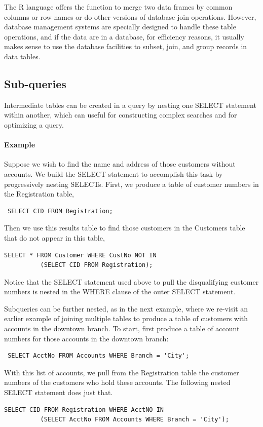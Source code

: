 The R language offers the  function to 
merge two data frames by common columns or row names or do other
versions of database join operations.
However, database management systems are specially designed to handle
these table operations, and if the data are in a database,
for efficiency reasons, it usually makes sense to use the database
facilities to subset, join, and group records in data tables.

\subsection{Sub-queries}
Intermediate tables can be created in a query by nesting 
one SELECT statement within another, 
which can useful for constructing complex searches 
and for optimizing a query.

\paragraph{Example}
Suppose we wish to find the name and address 
of those customers without accounts.
We build the SELECT statement to accomplish this task
by progressively nesting SELECTs. 
First, we produce a table of customer numbers
in the Registration table,
\begin{verbatim}
 SELECT CID FROM Registration;
\end{verbatim}
Then we use this results table to find those customers in 
the Customers table that do not appear in this table,
\begin{verbatim}
SELECT * FROM Customer WHERE CustNo NOT IN 
          (SELECT CID FROM Registration);
\end{verbatim}
Notice that the SELECT statement used above to pull the disqualifying 
customer numbers is nested in the WHERE clause of the outer SELECT statement.

Subqueries can be further nested, as in the next example, where
we re-visit an earlier example of joining multiple tables to produce a 
table of customers with accounts in the downtown branch.
To start, first produce a table of account numbers for those 
accounts in the downtown branch:
\begin{verbatim}
 SELECT AcctNo FROM Accounts WHERE Branch = 'City';
\end{verbatim}
With this list of accounts, we pull from the Registration table
the customer numbers of the customers who hold these accounts.
The following nested SELECT statement does just that. 
\begin{verbatim}
SELECT CID FROM Registration WHERE AcctNO IN 
          (SELECT AcctNo FROM Accounts WHERE Branch = 'City');
\end{verbatim}

